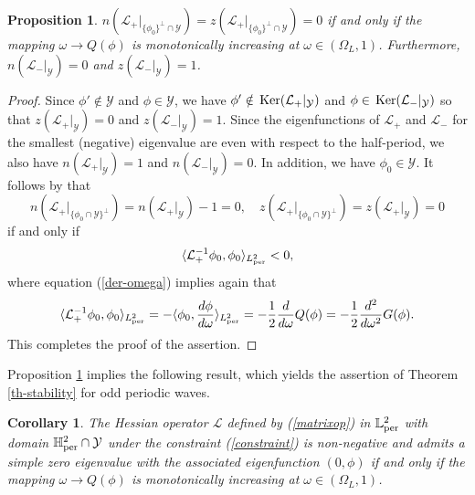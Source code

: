 \documentclass[12pt,reqno]{amsart}
\newcommand{\Ker}{{\rm \,Ker}}
\numberwithin{equation}{section}
\numberwithin{figure}{section}
\newtheorem{proposition}[theorem]{Proposition}
\newtheorem{corollary}[theorem]{Corollary}
\begin{document}
\begin{proposition}\label{propRR-constraint}
	$n(\mathcal{L}_+ |_{\{ \phi_0\}^{\perp} \cap \mathcal{Y}}) = z(\mathcal{L}_+ |_{\{ \phi_0\}^{\perp}  \cap \mathcal{Y}}) = 0$ if and only if the mapping $\omega \to Q(\phi)$ is monotonically increasing at $\omega \in (\Omega_L,1)$. Furthermore, $n(\mathcal{L}_- |_{\mathcal{Y}}) = 0$ and  $z(\mathcal{L}_- |_{\mathcal{Y}}) = 1$.
\end{proposition}

\begin{proof}
	Since $\phi' \notin \mathcal{Y}$ and $\phi \in \mathcal{Y}$, we have $\phi' \notin \Ker(\mathcal{L}_+ |_{\mathcal{Y}})$ and $\phi \in \Ker(\mathcal{L}_- |_{\mathcal{Y}})$ so that $z(\mathcal{L}_+ |_{\mathcal{Y}}) = 0$ and $z(\mathcal{L}_- |_{\mathcal{Y}}) = 1$. Since the eigenfunctions of $\mathcal{L}_+$ and $\mathcal{L}_-$ for the smallest (negative) eigenvalue are even with respect to the half-period, we also have 
	$n(\mathcal{L}_+ |_{\mathcal{Y}}) = 1$ and 	$n(\mathcal{L}_- |_{\mathcal{Y}}) = 0$. In addition, we have $\phi_0 \in \mathcal{Y}$. It follows by \cite[Theorem 2.7]{GeyerPel25} that 
	$$
	n(\mathcal{L}_+ |_{\{ \phi_0 \cap \mathcal{Y} \}^{\perp}}) = n(\mathcal{L}_+ |_{\mathcal{Y}}) - 1 = 0, \quad 
	z(\mathcal{L}_+ |_{\{ \phi_0 \cap \mathcal{Y} \}^{\perp}}) = z(\mathcal{L}_+ |_{\mathcal{Y}})  = 0
	$$
	if and only if 
	$$
	\langle \mathcal{L}_+^{-1} \phi_0, \phi_0 \rangle_{L^2_{\rm per}} < 0, 
	$$
	where equation (\ref{der-omega}) implies again that 
	$$
	\langle \mathcal{L}_+^{-1} \phi_0, \phi_0 \rangle_{L^2_{\rm per}} = 
	- \langle \phi_0, \frac{d \phi}{d \omega} \rangle_{L^2_{\rm per}} =- \frac{1}{2} \frac{d}{d\omega} Q(\phi) = - \frac{1}{2} \frac{d^2}{d \omega^2} G(\phi).
	$$ 
	This completes the proof of the assertion.
\end{proof}	

Proposition \ref{propRR-constraint} implies the following result, which yields the assertion of Theorem \ref{th-stability} for odd periodic waves.

\begin{corollary}
	
	The Hessian operator $\mathcal{L}$ defined by (\ref{matrixop}) in  $\mathbb{L}^2_{\rm per}$ with domain $\mathbb{H}^2_{\rm per} \cap \mathcal{Y}$ under the constraint (\ref{constraint}) is non-negative and admits a simple zero eigenvalue with the associated eigenfunction $(0,\phi)$ if and only if the mapping $\omega \to Q(\phi)$ is monotonically increasing at $\omega \in (\Omega_L,1)$. 
\end{corollary}	 
		 
\end{document}
